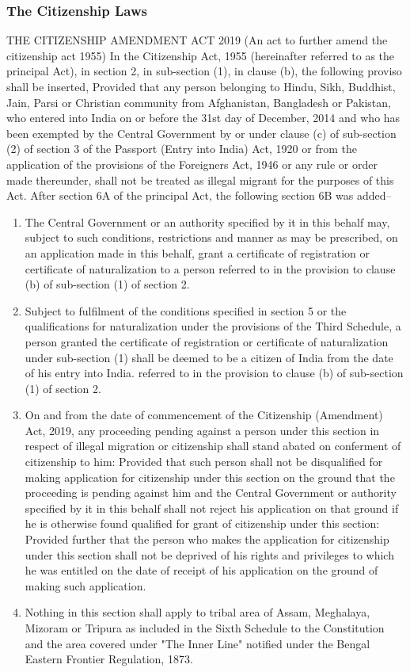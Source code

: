 \documentclass{article}
\begin{document}
\subsubsection{The Citizenship Laws}
THE CITIZENSHIP AMENDMENT ACT 2019 (An act to further amend the citizenship act 1955) In the Citizenship Act, 1955 (hereinafter referred to as the principal Act), in section 2, in sub-section (1), in clause (b), the following proviso shall be inserted, Provided that any person belonging to Hindu, Sikh, Buddhist, Jain, Parsi or Christian community from Afghanistan, Bangladesh or Pakistan, who entered into India on or before the 31st day of December, 2014 and who has been exempted by the Central Government by or under clause (c) of sub-section (2) of section 3 of the Passport (Entry into India) Act, 1920 or from the application of the provisions of the Foreigners Act, 1946 or any rule or order made thereunder, shall not be treated as illegal migrant for the purposes of this Act.
After section 6A of the principal Act, the following section 6B was added--
\begin{enumerate}
    \item The Central Government or an authority specified by it in this behalf may, subject to such conditions, restrictions and manner as may be prescribed, on an application made in this behalf, grant a certificate of registration or certificate of naturalization to a person
referred to in the provision to clause (b) of sub-section (1) of section 2.
    \item Subject to fulfilment of the conditions specified in section 5 or the qualifications for naturalization under the provisions of the
Third Schedule, a person granted the certificate of registration or certificate of naturalization under sub-section (1) shall be deemed
to be a citizen of India from the date of his entry into India.
referred to in the provision to clause (b) of sub-section (1) of section 2.
    \item On and from the date of commencement of the Citizenship (Amendment) Act, 2019, any proceeding pending against a person
under this section in respect of illegal migration or citizenship shall stand abated on conferment of citizenship to him: Provided that
such person shall not be disqualified for making application for citizenship under this section on the ground that the proceeding is
pending against him and the Central Government or authority specified by it in this behalf shall not reject his application on that
ground if he is otherwise found qualified for grant of citizenship under this section: Provided further that the person who makes the
application for citizenship under this section shall not be deprived of his rights and privileges to which he was entitled on the date of
receipt of his application on the ground of making such application.
    \item Nothing in this section shall apply to tribal area of Assam, Meghalaya, Mizoram or Tripura as included in the Sixth Schedule to
the Constitution and the area covered under "The Inner Line" notified under the Bengal Eastern Frontier Regulation, 1873.

\end{enumerate}
\end{document}
